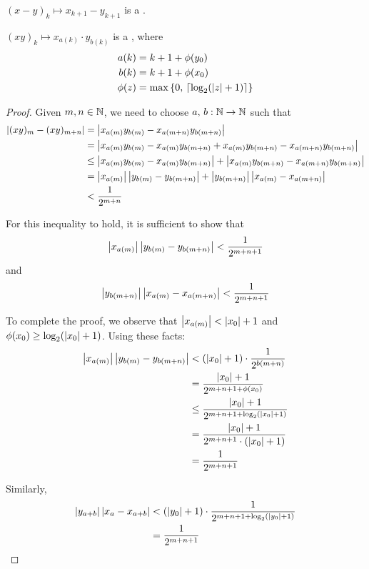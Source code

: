 \documentclass[leqno]{report}
\begin{document}
\begin{Corollary}[Subtraction]
    $(x-y)_k \mapsto x_{k+1} - y_{k+1}$ is a \FCCS.
\end{Corollary}

\begin{Proposition}[Multiplication]
    $(xy)_k \mapsto x_{a(k)} \cdot y_{b(k)}$ is a \FCCS, where
    \begin{align*}
        a(k) &= k + 1 + \phi(y_0) \\
        b(k) &= k + 1 + \phi(x_0) \\
        \phi(z) &= \max \left\{  0,\, \left\lceil \log_2(\left| z \right| + 1) \right\rceil  \right\}
    \end{align*}
\end{Proposition}

\begin{proof}
    Given $m, n \in \mathbb{N}$, we need to choose $a,\, b : \mathbb{N} \rightarrow \mathbb{N}$ such that
    \begin{align*}
        \left| (xy)_m - (xy)_{m+n} \right|
        &= \left| x_{a(m)} y_{b(m)} - x_{a(m+n)} y_{b(m+n)} \right| \\
        &= \left| x_{a(m)} y_{b(m)} - x_{a(m)} y_{b(m+n)} + x_{a(m)} y_{b(m+n)} - x_{a(m+n)} y_{b(m+n)} \right| \\
        &\leq \left| x_{a(m)} y_{b(m)} - x_{a(m)} y_{b(m+n)} \right| + \left| x_{a(m)} y_{b(m+n)} - x_{a(m+n)} y_{b(m+n)} \right| \\
        &= \left| x_{a(m)} \right|\left| y_{b(m)} - y_{b(m+n)} \right| + \left| y_{b(m+n)} \right|\left| x_{a(m)} - x_{a(m+n)} \right| \\
        &< \frac{1}{2^{m+n}}
    \end{align*}

    For this inequality to hold, it is sufficient to show that
    \[ \left| x_{a(m)} \right|\left| y_{b(m)} - y_{b(m+n)} \right| < \frac{1}{2^{m+n+1}} \]
    and
    \[ \left| y_{b(m+n)} \right|\left| x_{a(m)} - x_{a(m+n)} \right| < \frac{1}{2^{m+n+1}} \]

    To complete the proof, we observe that $\left| x_{a(m)} \right| < \left| x_0 \right| + 1$ and $\phi(x_0) \geq \log_2(\left| x_0 \right| + 1)$. Using these facts:
    \begin{align*}
        \left| x_{a(m)} \right|\left| y_{b(m)} - y_{b(m+n)} \right|
        &< (\left| x_0 \right| + 1) \cdot \frac{1}{2^{b(m+n)}} \\
        &= \frac{\left| x_0 \right| + 1}{2^{m + n + 1 + \phi(x_0)}} \\
        &\leq \frac{\left| x_0 \right| + 1}{2^{m + n + 1 + \log_2(\left| x_0 \right| + 1)}} \\
        &= \frac{\left| x_0 \right| + 1}{2^{m + n + 1} \cdot (\left| x_0 \right| + 1)} \\
        &= \frac{1}{2^{m + n + 1}}
    \end{align*}

    Similarly,
    \begin{align*}
        \left| y_{a+b} \right|\left| x_a - x_{a+b} \right|
        &< (\left| y_0 \right| + 1) \cdot \frac{1}{2^{m + n + 1 + \log_2(\left| y_0 \right| + 1)}} \\
        &= \frac{1}{2^{m + n + 1}}
    \end{align*}
\end{proof}



\end{document}
